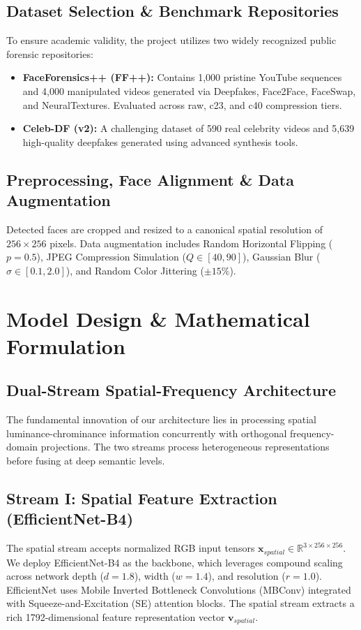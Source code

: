 \documentclass[12pt,a4paper]{report}
\begin{document}
\section{Dataset Selection \& Benchmark Repositories}
To ensure academic validity, the project utilizes two widely recognized public forensic repositories:
\begin{itemize}
    \item \textbf{FaceForensics++ (FF++):} Contains 1,000 pristine YouTube sequences and 4,000 manipulated videos generated via Deepfakes, Face2Face, FaceSwap, and NeuralTextures. Evaluated across raw, c23, and c40 compression tiers.
    \item \textbf{Celeb-DF (v2):} A challenging dataset of 590 real celebrity videos and 5,639 high-quality deepfakes generated using advanced synthesis tools.
\end{itemize}

\section{Preprocessing, Face Alignment \& Data Augmentation}
Detected faces are cropped and resized to a canonical spatial resolution of $256 \times 256$ pixels. Data augmentation includes Random Horizontal Flipping ($p=0.5$), JPEG Compression Simulation ($Q \in [40, 90]$), Gaussian Blur ($\sigma \in [0.1, 2.0]$), and Random Color Jittering ($\pm 15\%$).

\newpage

\chapter{Model Design \& Mathematical Formulation}

\section{Dual-Stream Spatial-Frequency Architecture}
The fundamental innovation of our architecture lies in processing spatial luminance-chrominance information concurrently with orthogonal frequency-domain projections. The two streams process heterogeneous representations before fusing at deep semantic levels.

\section{Stream I: Spatial Feature Extraction (EfficientNet-B4)}
The spatial stream accepts normalized RGB input tensors $\mathbf{x}_{spatial} \in \mathbb{R}^{3 \times 256 \times 256}$. We deploy EfficientNet-B4 as the backbone, which leverages compound scaling across network depth ($d=1.8$), width ($w=1.4$), and resolution ($r=1.0$). EfficientNet uses Mobile Inverted Bottleneck Convolutions (MBConv) integrated with Squeeze-and-Excitation (SE) attention blocks. The spatial stream extracts a rich 1792-dimensional feature representation vector $\mathbf{v}_{spatial}$.
\end{document}
